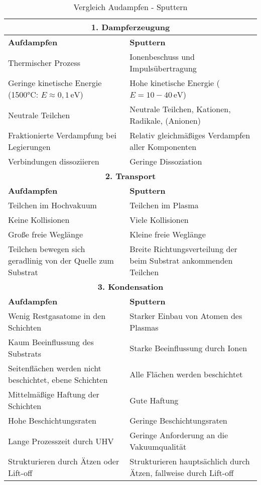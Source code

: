 \documentclass{article} %
\begin{document}
\begin{table}[htb!]
    \centering
    \renewcommand{\arraystretch}{1.5} %
    \begin{tabular}{|p{6cm}|p{6cm}|}
        \hline
        \multicolumn{2}{|c|}{\textbf{1. Dampferzeugung}} \\ \hline
        \textbf{Aufdampfen} & \textbf{Sputtern} \\ \hline
        Thermischer Prozess & Ionenbeschuss und Impulsübertragung \\
        Geringe kinetische Energie (1500°C: $E \approx 0,1 \, \mathrm{eV}$) & Hohe kinetische Energie ($E = 10 - 40 \, \mathrm{eV}$) \\
        Neutrale Teilchen & Neutrale Teilchen, Kationen, Radikale, (Anionen) \\
        Fraktionierte Verdampfung bei Legierungen & Relativ gleichmäßiges Verdampfen aller Komponenten \\
        Verbindungen dissoziieren & Geringe Dissoziation \\ \hline
        \multicolumn{2}{|c|}{\textbf{2. Transport}} \\ \hline
        \textbf{Aufdampfen} & \textbf{Sputtern} \\ \hline
        Teilchen im Hochvakuum & Teilchen im Plasma \\
        Keine Kollisionen & Viele Kollisionen \\
        Große freie Weglänge & Kleine freie Weglänge \\
        Teilchen bewegen sich geradlinig von der Quelle zum Substrat & Breite Richtungsverteilung der beim Substrat ankommenden Teilchen \\ \hline
        \multicolumn{2}{|c|}{\textbf{3. Kondensation}} \\ \hline
        \textbf{Aufdampfen} & \textbf{Sputtern} \\ \hline
        Wenig Restgasatome in den Schichten & Starker Einbau von Atomen des Plasmas \\
        Kaum Beeinflussung des Substrats & Starke Beeinflussung durch Ionen \\
        Seitenflächen werden nicht beschichtet, ebene Schichten & Alle Flächen werden beschichtet \\
        Mittelmäßige Haftung der Schichten & Gute Haftung \\
        Hohe Beschichtungsraten & Geringe Beschichtungsraten \\
        Lange Prozesszeit durch UHV & Geringe Anforderung an die Vakuumqualität \\
        Strukturieren durch Ätzen oder Lift-oﬀ & Strukturieren hauptsächlich durch Ätzen, fallweise durch Lift-off \\ \hline
    \end{tabular}
    \captionsetup{labelfont=bf} %
    \caption{Vergleich Audampfen - Sputtern}
    \label{tab:Vergleich Aufdampfen - Sputtern}
\end{table}
\end{document}
